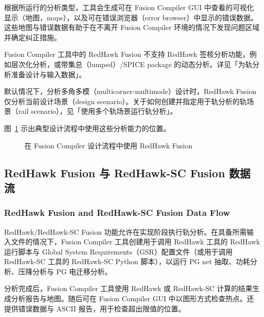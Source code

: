 根据所运行的分析类型，工具会生成可在 Fusion Compiler GUI 中查看的可视化显示（地图，maps），以及可在错误浏览器（error browser）中显示的错误数据。这些地图与错误数据有助于在不离开 Fusion Compiler 环境的情况下发现问题区域并确定纠正措施。

\begin{noteBox}
Fusion Compiler 工具中的 RedHawk Fusion 不支持 RedHawk 签核分析功能，例如层次化分析，或带集总（lumped）/SPICE package 的动态分析。详见「为轨分析准备设计与输入数据」。

默认情况下，分析多角多模（multicorner-multimode）设计时，RedHawk Fusion 仅分析当前设计场景（design scenario）。关于如何创建并指定用于轨分析的轨场景（rail scenario），见「使用多个轨场景运行轨分析」。
\end{noteBox}

图~\ref{fig:rh-flow} 示出典型设计流程中使用这些分析能力的位置。

\begin{figure}[htbp]
\centering
{}
\caption{在 Fusion Compiler 设计流程中使用 RedHawk Fusion}
\label{fig:rh-flow}
\end{figure}

\subsection{RedHawk Fusion 与 RedHawk-SC Fusion 数据流}
\subsubsection*{RedHawk Fusion and RedHawk-SC Fusion Data Flow}

RedHawk/RedHawk-SC Fusion 功能允许在实现阶段执行轨分析。在具备所需输入文件的情况下，Fusion Compiler 工具创建用于调用 RedHawk 工具的 RedHawk 运行脚本与 Global System Requirements（GSR）配置文件（或用于调用 RedHawk-SC 工具的 RedHawk-SC Python 脚本），以运行 PG net 抽取、功耗分析、压降分析与 PG 电迁移分析。

分析完成后，Fusion Compiler 工具使用 RedHawk 或 RedHawk-SC 计算的结果生成分析报告与地图。随后可在 Fusion Compiler GUI 中以图形方式检查热点。还提供错误数据与 ASCII 报告，用于检查超出限值的位置。

